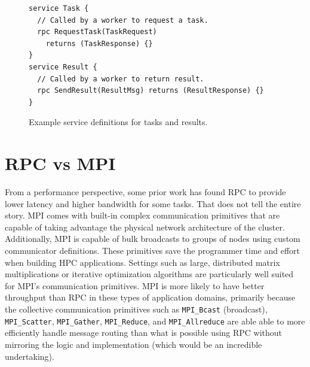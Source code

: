 \documentclass[conference]{IEEEtran}
\begin{document}
\begin{figure}
  \begin{lstlisting}
service Task {
  // Called by a worker to request a task.
  rpc RequestTask(TaskRequest)
    returns (TaskResponse) {}
}
service Result {
  // Called by a worker to return result.
  rpc SendResult(ResultMsg) returns (ResultResponse) {}
}
  \end{lstlisting}
  \caption{Example service definitions for tasks and results.}
  \label{fig:task-result-services}
\end{figure}

\section{RPC vs MPI}
From a performance perspective, some prior work \cite{rpc-perf} has found RPC to
provide lower latency and higher bandwidth for some tasks. That does not tell
the entire story. MPI comes with built-in complex communication primitives that
are capable of taking advantage the physical network architecture of the
cluster. Additionally, MPI is capable of bulk broadcasts to groups of nodes
using custom communicator definitions. These primitives save the programmer
time and effort when building HPC applications. Settings such as large,
distributed matrix multiplications or iterative optimization algorithms are
particularly well suited for MPI's communication primitives. MPI is more likely
to have better throughput than RPC in these types of application domains,
primarily because the collective communication primitives such as
\texttt{MPI\_Bcast} (broadcast), \texttt{MPI\_Scatter}, \texttt{MPI\_Gather},
\texttt{MPI\_Reduce}, and \texttt{MPI\_Allreduce} are able able to more efficiently
handle message routing than what is possible using RPC without mirroring the logic
and implementation (which would be an incredible undertaking).
\end{document}
